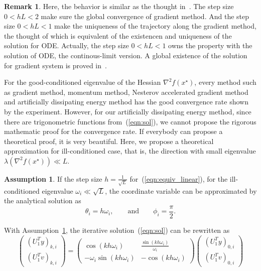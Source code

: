 \documentclass[11pt,fceqn]{article}
\numberwithin{equation}{section}
\theoremstyle{definition}
\newtheorem{rem}[thm]{Remark}
\newtheorem{assumption}{Assumption}
\begin{document}
\begin{rem}
Here, the behavior is similar as the thought in~\citep{lee2016gradient}. The step size $0<hL<2$ make sure the global convergence of gradient method. And the step size $0<hL<1$ make the uniqueness of the trajectory along the gradient method, the thought of which is equivalent of the existencen and uniqueness of the solution for ODE. Actually, the step size $0<hL<1$ owns the property with the solution of ODE, the continous-limit version. A global existence of the solution for gradient system is proved in~\citep{perko2013differential}.
\end{rem}
For the good-conditioned eigenvalue of the Hessian $\nabla^{2} f(x^{\star})$, every method such as gradient method, momentum method, Nesterov accelerated gradient method and artificially dissipating energy method has the good convergence rate shown by the experiment. However, for our artificially dissipating energy method, since there are trigonometric functions from~(\ref{eqn:sol}), we cannot propose the rigorous mathematic proof for the convergence rate. If everybody can propose a theoretical proof, it is very beautiful. Here, we propose a theoretical approximation for ill-conditioned case, that is, the direction with small eigenvalue $\lambda (\nabla^{2}f(x^{\star})) \ll L$. 
\begin{assumption}
\label{ass:ill}
If the step size $h = \frac{1}{\sqrt{L}}$ for~(\ref{eqn:equiv_linear}), for the ill-conditioned eigenvalue $\omega_{i} \ll \sqrt{L}$, the coordinate variable can be approximated by the analytical solution as 
\begin{equation}
\label{eqn:approx}
\theta_{i} = h\omega_{i}, \qquad \text{and}\qquad\phi_{i} = \frac{\pi}{2}.
\end{equation}
\end{assumption}
With Assumption~\ref{ass:ill}, the iterative solution~(\ref{eqn:sol}) can be rewritten as 
\begin{equation}
\label{eqn:ass_vartran}
 \begin{pmatrix} (U_{1}^{T}y)_{k,i} \\ (U_{1}^{T}v)_{k,i} \end{pmatrix} = \begin{pmatrix} \cos(kh\omega_{i}) & \frac{\sin(kh\omega_{i})}{\omega_{i}}\\ -\omega_{i}\sin(kh\omega_{i}) & -\cos(kh\omega_{i}) \end{pmatrix}\begin{pmatrix} (U_{1}^{T}y)_{0,i} \\ (U_{1}^{T}v)_{0,i} \end{pmatrix}
\end{equation}
\end{document}
